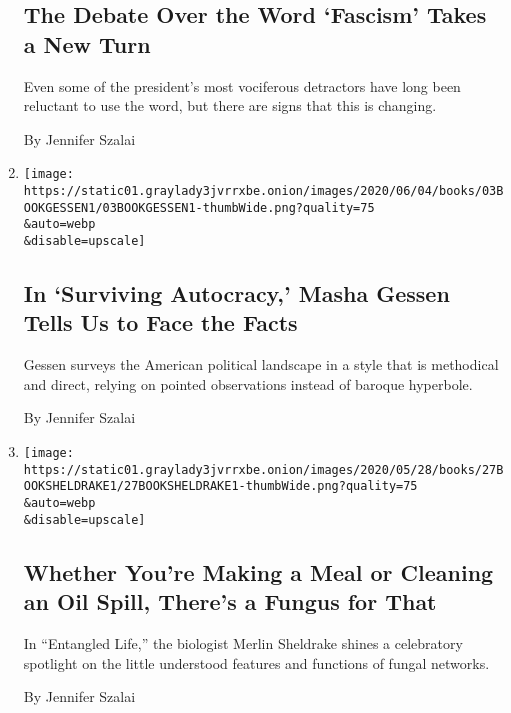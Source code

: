 \begin{enumerate}
  \hypertarget{the-debate-over-the-word-fascism-takes-a-new-turn}{%
  \subsection{The Debate Over the Word `Fascism' Takes a New
  Turn}\label{the-debate-over-the-word-fascism-takes-a-new-turn}}

  Even some of the president's most vociferous detractors have long been
  reluctant to use the word, but there are signs that this is changing.

  By Jennifer Szalai
\item
  \href{/2020/06/03/books/review-surviving-autocracy-masha-gessen.html}{}

  \texttt{[image: https://static01.graylady3jvrrxbe.onion/images/2020/06/04/books/03BOOKGESSEN1/03BOOKGESSEN1-thumbWide.png?quality=75\\\&auto=webp\\\&disable=upscale]}

  \hypertarget{in-surviving-autocracy-masha-gessen-tells-us-to-face-the-facts}{%
  \subsection{In `Surviving Autocracy,' Masha Gessen Tells Us to Face
  the
  Facts}\label{in-surviving-autocracy-masha-gessen-tells-us-to-face-the-facts}}

  Gessen surveys the American political landscape in a style that is
  methodical and direct, relying on pointed observations instead of
  baroque hyperbole.

  By Jennifer Szalai
\item
  \href{/2020/05/27/books/review-entangled-life-fungi-merlin-sheldrake.html}{}

  \texttt{[image: https://static01.graylady3jvrrxbe.onion/images/2020/05/28/books/27BOOKSHELDRAKE1/27BOOKSHELDRAKE1-thumbWide.png?quality=75\\\&auto=webp\\\&disable=upscale]}

  \hypertarget{whether-youre-making-a-meal-or-cleaning-an-oil-spill-theres-a-fungus-for-that}{%
  \subsection{Whether You're Making a Meal or Cleaning an Oil Spill,
  There's a Fungus for
  That}\label{whether-youre-making-a-meal-or-cleaning-an-oil-spill-theres-a-fungus-for-that}}

  In ``Entangled Life,'' the biologist Merlin Sheldrake shines a
  celebratory spotlight on the little understood features and functions
  of fungal networks.

  By Jennifer Szalai
\end{enumerate}


